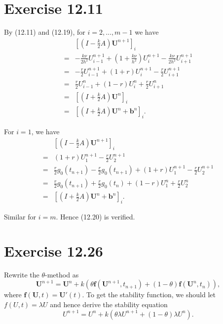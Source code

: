 \documentclass[twocolumn,10pt]{article}
\begin{document}
\section*{\large Exercise 12.11}

 By (12.11) and (12.19), for $i=2,...,m-1$ we have
\begin{align*}
    & \left[\left(I-\frac{k}{2}A\right)\mathbf{U}^{n+1}\right]_i\\
    =& -\frac{k\nu}{2h^2}U_{i-1}^{n+1} + \left(1+\frac{k\nu}{h^2}\right)U_i^{n+1} - \frac{k\nu}{2h^2}U_{i+1}^{n+1}\\
    =& -\frac{r}{2}U_{i-1}^{n+1} + \left(1+r\right)U_i^{n+1} - \frac{r}{2}U_{i+1}^{n+1}\\
    =& \frac{r}{2}U_{i-1}^{n} + \left(1-r\right)U_i^{n} + \frac{r}{2}U_{i+1}^{n}\\
    =& \left[\left(I+\frac{k}{2}A\right)\mathbf{U}^{n}\right]_i\\
    =& \left[\left(I+\frac{k}{2}A\right)\mathbf{U}^{n}+\mathbf{b}^n\right]_i.
\end{align*}

For $i=1$, we have
\begin{align*}
    & \left[\left(I-\frac{k}{2}A\right)\mathbf{U}^{n+1}\right]_i\\
    =& \left(1+r\right)U_1^{n+1} - \frac{r}{2}U_{2}^{n+1}\\
    =& \frac{r}{2}g_0(t_{n+1}) -\frac{r}{2}g_0(t_{n+1}) + \left(1+r\right)U_1^{n+1} - \frac{r}{2}U_{2}^{n+1}\\
    =& \frac{r}{2}g_0(t_{n+1}) + \frac{r}{2}g_0(t_{n}) + \left(1-r\right)U_1^{n} + \frac{r}{2}U_{2}^{n}\\
    =& \left[\left(I+\frac{k}{2}A\right)\mathbf{U}^{n}+\mathbf{b}^n\right]_i.
\end{align*}

Similar for $i=m$. Hence (12.20) is verified.

\section*{\large Exercise 12.26}

 Rewrite the $\theta$-method as
\begin{equation*}
    \mathbf{U}^{n+1}=\mathbf{U}^n+k\left(\theta \mathbf{f}(\mathbf{U}^{n+1},t_{n+1})+(1-\theta)\mathbf{f}(\mathbf{U}^{n},t_{n})\right),
\end{equation*}
where $\mathbf{f}(\mathbf{U},t)=\mathbf{U}'(t)$. To get the stability function, we should let $f(U,t)=\lambda U$ and hence derive the stability equation
\begin{equation*}
    U^{n+1}=U^n+k\left(\theta \lambda U^{n+1}+(1-\theta)\lambda U^n\right).
\end{equation*}
\end{document}
